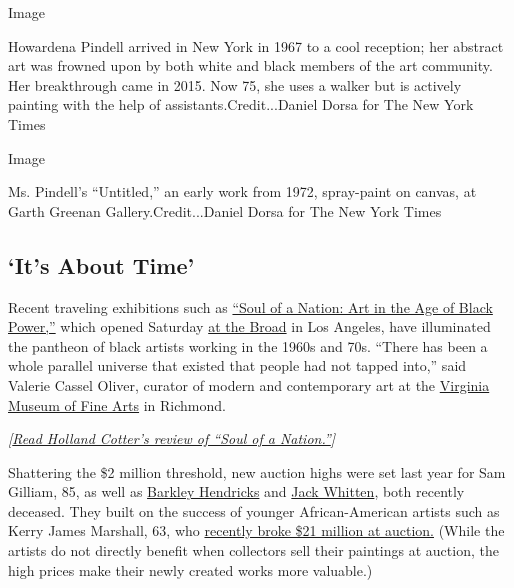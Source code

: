 Image

Howardena Pindell arrived in New York in 1967 to a cool reception; her
abstract art was frowned upon by both white and black members of the art
community. Her breakthrough came in 2015. Now 75, she uses a walker but
is actively painting with the help of assistants.Credit...Daniel Dorsa
for The New York Times

Image

Ms. Pindell's ``Untitled,'' an early work from 1972, spray-paint on
canvas, at Garth Greenan Gallery.Credit...Daniel Dorsa for The New York
Times

\hypertarget{its-about-time}{%
\subsection{`It's About Time'}\label{its-about-time}}

Recent traveling exhibitions such as
\href{https://www.thebroad.org/soul-of-a-nation}{``Soul of a Nation: Art
in the Age of Black Power,''} which opened Saturday
\href{https://www.thebroad.org/soul-of-a-nation}{at the Broad} in Los
Angeles, have illuminated the pantheon of black artists working in the
1960s and 70s. ``There has been a whole parallel universe that existed
that people had not tapped into,'' said Valerie Cassel Oliver, curator
of modern and contemporary art at the
\href{https://www.vmfa.museum/}{Virginia Museum of Fine Arts} in
Richmond.

\emph{{[}}\href{https://www.nytimes.com/2018/09/13/arts/design/soul-of-a-nation-review-brooklyn-museum-black-power.html}{\emph{Read
Holland Cotter's review of ``Soul of a Nation.''}}\emph{{]}}

Shattering the \$2 million threshold, new auction highs were set last
year for Sam Gilliam, 85, as well as
\href{https://www.culturetype.com/2018/05/18/two-1970s-era-portraits-by-barkley-l-hendricks-top-2-million-at-sothebys-shattering-the-artists-previous-record/}{Barkley
Hendricks} and
\href{https://www.culturetype.com/2018/11/15/jack-whittens-ancient-mentor-i-reaches-2-2-million-establishing-new-auction-record-more-than-twice-his-previous-high-mark/}{Jack
Whitten}, both recently deceased. They built on the success of younger
African-American artists such as Kerry James Marshall, 63, who
\href{https://www.nytimes.com/2018/05/18/arts/sean-combs-kerry-james-marshall.html}{recently
broke \$21 million at auction.} (While the artists do not directly
benefit when collectors sell their paintings at auction, the high prices
make their newly created works more valuable.)

